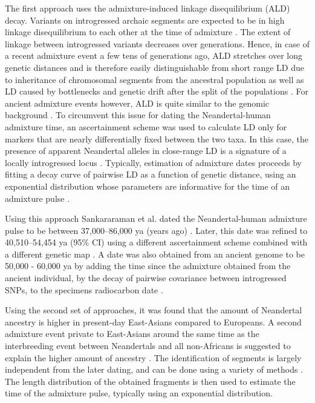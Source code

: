 \documentclass[]{article}
\begin{document}
The first approach uses the admixture-induced linkage disequilibrium (ALD) decay. Variants on introgressed archaic segments are expected to be in high linkage disequilibrium to each other at the time of admixture \citep{chakraborty_admixture_1988,stephens_mapping_1994,wall_detecting_2000}. The extent of linkage between introgressed variants decreases over generations. Hence, in case of a recent admixture event a few tens of generations ago, ALD stretches  over long genetic distances
\citep{patterson_methods_2004} and is therefore easily distinguishable from short range LD due to inheritance of chromosomal segments from the ancestral population as well as LD caused by bottlenecks and genetic drift after the split of the populations \citep{moorjani_history_2011,sankararaman_date_2012}. For ancient admixture events however, ALD is quite similar to the genomic background \citep{sankararaman_date_2012}. To circumvent this issue for dating the Neandertal-human admixture time, an ascertainment scheme was used to calculate LD only for markers that are nearly differentially fixed between the two taxa. In this case, the presence of apparent Neandertal alleles in close-range LD is a signature of a locally introgressed locus
\citep{sankararaman_date_2012}. Typically, estimation of admixture dates proceeds by fitting a decay curve of pairwise LD as a function of genetic distance, using an exponential distribution whose parameters are informative for the time of an admixture pulse \citep{moorjani_history_2011,loh_inferring_2013}. 

Using this approach Sankararaman et al. dated the Neandertal-human admixture pulse to be  between 37,000--86,000 ya (years ago) \citep{sankararaman_date_2012}. Later, this date was refined to 40,510--54,454 ya (95\% CI) using a different ascertainment scheme combined with a different genetic map \citep{moorjani_genetic_2016}. A date was also obtained from an ancient genome to be 50,000 - 60,000 ya by adding the time since the admixture obtained from the ancient individual, by the decay of pairwise covariance between
introgressed SNPs, to the specimens radiocarbon date \citep{fu_genome_2014}.

Using the second set of approaches, it was found that the amount of Neandertal ancestry is higher in present-day East-Asians compared to Europeans. A second admixture event private to East-Asians around the same time as the interbreeding event between Neandertals and all non-Africans is suggested to explain the higher amount of ancestry \citep{kim_selection_2015,vernot_complex_2015}. The identification of segments is largely independent from the later dating, and can be done using a variety of methods \citep{racimo_signatures_2017,seguin_orlando_paleogenomics_2014,vernot_excavating_2016,sankararaman_combined_2016,skov_detecting_2018}. The length distribution of the obtained fragments is then used to estimate the time of the admixture pulse, typically using an exponential distribution.
\end{document}
